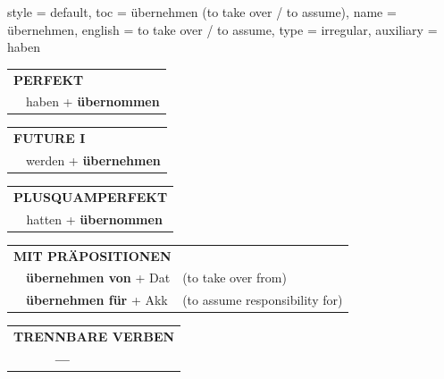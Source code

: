 \begin{verbentry}{
  style = {default},
  toc = {übernehmen (to take over / to assume)},
  name = {übernehmen},
  english = {to take over / to assume},
  type = {irregular},
  auxiliary = {haben}
}
 \begin{tabular}{rl}
     \multicolumn{2}{l}{\textbf{PERFEKT}}\\
   & haben + \textbf{übernommen}\\
  \end{tabular}
\hfill
   \begin{tabular}{rl}
    \multicolumn{2}{l}{\textbf{FUTURE I} }\\
   & werden + \textbf{übernehmen}\\
  \end{tabular}
\hfill
   \begin{tabular}{rl}
      \multicolumn{2}{l}{\textbf{PLUSQUAMPERFEKT}}\\
   & hatten + \textbf{übernommen}\\
  \end{tabular}

   \vspace{10pt}

   \begin{tabular}{lll}
      \multicolumn{3}{l}{\textbf{MIT PRÄPOSITIONEN}}\\
& \textbf{übernehmen von} + Dat & (to take over from)\\
& \textbf{übernehmen für} + Akk & (to assume responsibility for)\\
\end{tabular}
  \hfill
   \begin{tabular}{lll}
\multicolumn{3}{l}{\textbf{TRENNBARE VERBEN}}\\
& \textbf{---} & \\
\end{tabular}

  \vspace{-5pt}
\end{verbentry}

